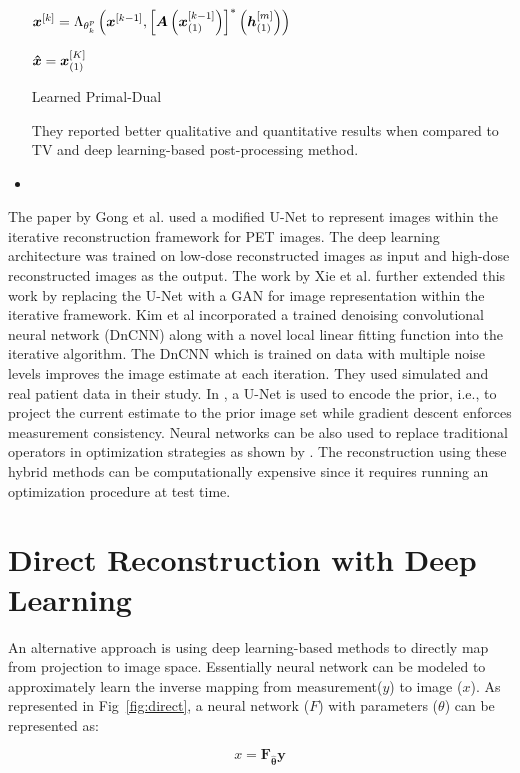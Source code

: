 \begin{itemize}
\begin{algorithm}
{		$\bm{x}^{[k]}=\Lambda_{\theta_{k}^{p}}\left(\bm{x}^{[k-1]},\left[\bm{A}\left(\bm{x}_{(1)}^{[k-1]}\right)\right]^{*}\left(\bm{h}_{(1)}^{[m]}\right)\right)$
				
	}
    \Return $\bm{\hat{x}} = \bm{x}_{(1)}^{[K]}$
	\caption{Learned Primal-Dual}
	\label{alg:pd}
\end{algorithm}
They reported better qualitative and quantitative results when compared to TV and deep learning-based post-processing method. 

\item 
\end{itemize}

The paper by Gong et al. used a modified U-Net to represent images within the iterative reconstruction framework for \ac{PET} images. The deep learning architecture was trained on low-dose reconstructed images as input and high-dose reconstructed images as the output. The work by Xie et al. further extended this work by replacing the U-Net with a \ac{GAN} for image representation within the iterative framework. Kim et al incorporated a trained denoising convolutional neural network (DnCNN) along with a novel local linear fitting function into the iterative algorithm. The DnCNN which is trained on data with multiple noise levels improves the image estimate at each iteration. They used simulated and real patient data in their study. In \cite{gupta2018cnn}, a U-Net is used to encode the prior, i.e., to project the current estimate to the prior image set while gradient descent enforces measurement consistency. Neural networks can be also used to replace traditional operators in optimization strategies as shown by \cite{adler2018learned}. The reconstruction using these hybrid methods can be computationally expensive since it requires running an optimization procedure at test time.

\section{Direct Reconstruction with Deep Learning}

An alternative approach is using deep learning-based methods to directly map from projection to image space. Essentially neural network can be modeled to approximately learn  the inverse mapping from measurement($y$) to image ($x$). As represented in Fig~\ref{fig:direct}, a neural network ($F$) with parameters ($\theta$) can be represented as:

\begin{equation}\label{eq:direct}
x=\boldsymbol{F}_{\widehat{\boldsymbol{\theta}}} \boldsymbol{y}
\end{equation}

